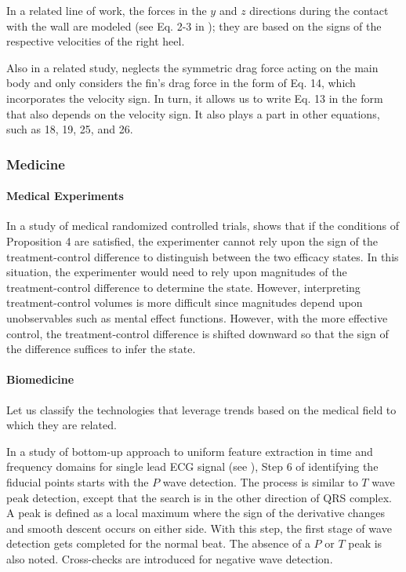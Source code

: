 \documentclass[11pt]{book}
\begin{document}
In a related line of work, the forces in the $y$ and $z$ directions during the contact with
the wall are modeled (see Eq. 2-3 in \cite{mori2020simulation}); they
are based on the signs of the respective velocities of the right heel.

Also in a related study, \cite{tahmasian2020dynamic} neglects the symmetric drag force acting
on the main body and only considers the fin's drag force in the form
of Eq. 14, which incorporates the velocity sign. In turn, it allows
us to write Eq. 13 in the form that also depends on the velocity sign.
It also plays a part in other equations, such as 18, 19, 25, and 26.


\subsubsection{Medicine}


\paragraph{Medical Experiments}

In a study of medical randomized controlled trials, \cite{chemla2019controls} shows that if the conditions of Proposition 4  are
satisfied, the experimenter cannot rely upon the sign of the treatment-control
difference to distinguish between the two efficacy states. In this
situation, the experimenter would need to rely upon magnitudes of
the treatment-control difference to determine the state. However,
interpreting treatment-control volumes is more difficult since magnitudes
depend upon unobservables such as mental effect functions. However,
with the more effective control, the treatment-control difference
is shifted downward so that the sign of the difference suffices to
infer the state.


\paragraph{Biomedicine}

Let us classify the technologies that leverage trends based on the
medical field to which they are related. 

In a study of bottom-up approach to uniform feature extraction
in time and frequency domains for single lead ECG signal (see \cite{srikanth2002bottom}), Step 6 of identifying the fiducial points
starts with the $P$ wave detection. The process is similar to $T$ wave
peak detection, except that the search is in the other direction of
QRS complex. A peak is defined as a local maximum where the sign of
the derivative changes and smooth descent occurs on either side. With
this step, the first stage of wave detection gets completed for the
normal beat. The absence of a $P$ or $T$ peak is also noted. Cross-checks
are introduced for negative wave detection. 
\end{document}
